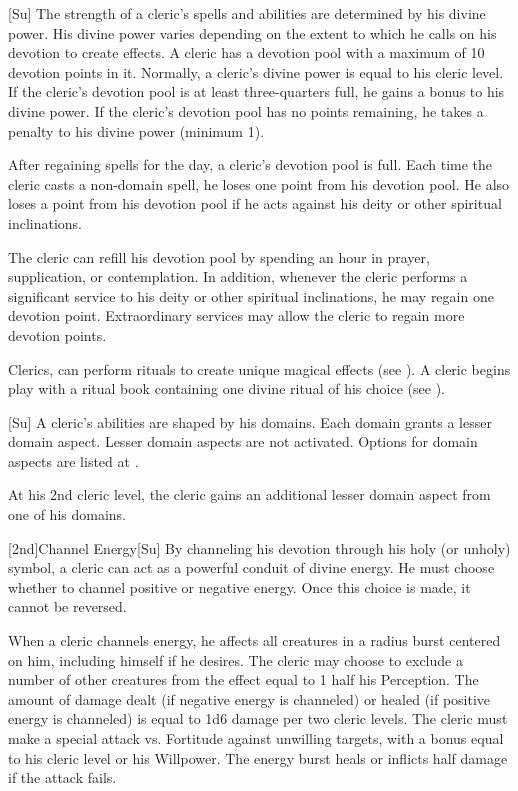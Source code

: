 [Su]
The strength of a cleric's spells and abilities are determined by his divine power.
His divine power varies depending on the extent to which he calls on his devotion to create effects.
A cleric has a devotion pool with a maximum of 10 devotion points in it.
Normally, a cleric's divine power is equal to his cleric level.
If the cleric's devotion pool is at least three-quarters full, he gains a  bonus to his divine power.
If the cleric's devotion pool has no points remaining, he takes a  penalty to his divine power (minimum 1).

After regaining spells for the day, a cleric's devotion pool is full.
Each time the cleric casts a non-domain spell, he loses one point from his devotion pool.
He also loses a point from his devotion pool if he acts against his deity or other spiritual inclinations.

The cleric can refill his devotion pool by spending an hour in prayer, supplication, or contemplation.
In addition, whenever the cleric performs a significant service to his deity or other spiritual inclinations, he may regain one devotion point.
Extraordinary services may allow the cleric to regain more devotion points.

Clerics, can perform rituals to create unique magical effects (see ).
A cleric begins play with a ritual book containing one divine ritual of his choice (see ).

[Su]
A cleric's abilities are shaped by his domains.
Each domain grants a lesser domain aspect.
Lesser domain aspects are not activated.
Options for domain aspects are listed at .

At his 2nd cleric level, the cleric gains an additional lesser domain aspect from one of his domains.

[2nd]{Channel Energy}[Su]
By channeling his devotion through his holy (or unholy) symbol, a cleric can act as a powerful conduit of divine energy.
He must choose whether to channel positive or negative energy.
Once this choice is made, it cannot be reversed.

When a cleric channels energy, he affects all creatures in a \areamed radius burst centered on him, including himself if he desires.
The cleric may choose to exclude a number of other creatures from the effect equal to 1 \add half his Perception.
The amount of damage dealt (if negative energy is channeled) or healed (if positive energy is channeled) is equal to 1d6 damage per two cleric levels.
The cleric must make a special attack vs. Fortitude against unwilling targets, with a bonus equal to his cleric level or his Willpower.
The energy burst heals or inflicts half damage if the attack fails.

